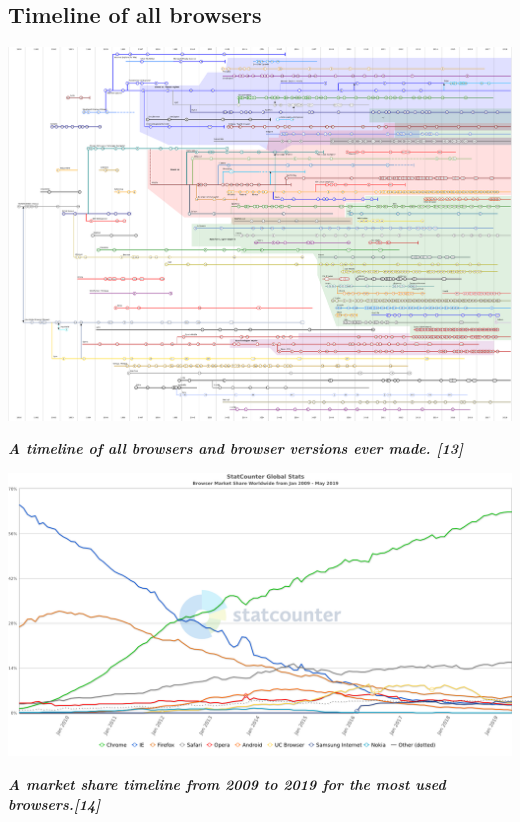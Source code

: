 \documentclass[runningheads]{llncs}
\begin{document}
		\subsection{Timeline of all browsers}	\includegraphics[scale=0.7]{TimelineOfWebBrowsers.png}
			\begin{center}
				\textit{\textbf{A timeline of all browsers and browser versions ever made. [13]}}\\
			\end{center}

		\includegraphics[scale=0.31]{WebBrowserMarketShare.png}
		\begin{center}
			\textit{\textbf{A market share timeline from 2009 to 2019 for the most used browsers.[14]}}
		\end{center}
		
\end{document}
